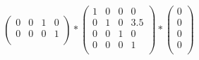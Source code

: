 \documentclass[a4paper,11pt,DIV11]{scrartcl}
\begin{document}
\begin{align}
\begin{pmatrix}
0 & 0 & 1 & 0 \\
0 & 0 & 0 & 1 \\
\end{pmatrix}
*
\begin{pmatrix}
1 & 0 & 0 & 0 \\
0 & 1 & 0 & 3.5 \\
0 & 0 & 1 & 0 \\
0 & 0 & 0 & 1 \\
\end{pmatrix}
*
\begin{pmatrix}
0 \\
0 \\
0 \\
0 \\
\end{pmatrix}
\end{align}
\end{document}
